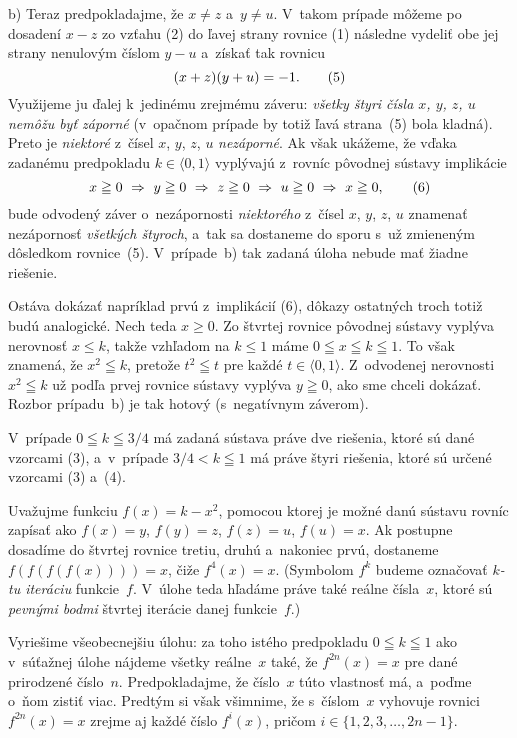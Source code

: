 {\smallskip
b) Teraz predpokladajme, že $x\ne z$ a~$ y \ne u$.
V~takom prípade môžeme po dosadení $x-z$ zo vzťahu (2)
do ľavej strany rovnice (1) následne vydeliť obe jej strany
nenulovým číslom $y-u$ a~získať tak rovnicu
$$
(x+z)(y+u) =-1.
\tag5
$$
Využijeme ju ďalej k~jedinému zrejmému záveru: {\sl všetky štyri
čísla $x$, $y$, $z$, $u$ nemôžu byť záporné} (v~opačnom prípade
by totiž ľavá strana~(5) bola kladná). Preto je {\it niektoré\/} z~čísel
$x$, $y$, $z$, $u$ {\it nezáporné}. Ak však ukážeme, že vďaka zadanému predpokladu
$k\in\langle0,1\rangle$ vyplývajú z~rovníc pôvodnej sústavy implikácie
$$
x\geqq0\ \Rightarrow\
y\geqq0\ \Rightarrow\
z\geqq0\ \Rightarrow\
u\geqq0\ \Rightarrow\
x\geqq0,
\tag6
$$
bude odvodený záver o~nezápornosti {\it niektorého\/} z~čísel $x$, $y$, $z$, $u$
znamenať nezápornosť {\it všetkých štyroch}, a~tak sa dostaneme do sporu s~už
zmieneným dôsledkom rovnice~(5). V~prípade~b) tak zadaná úloha
nebude mať žiadne riešenie.

Ostáva dokázať napríklad prvú z~implikácií (6),
dôkazy ostatných troch totiž budú analogické.
Nech teda $x\ge0$. Zo štvrtej rovnice
pôvodnej sústavy vyplýva nerovnosť $x \le k$, takže vzhľadom na
$k\le1$ máme $0\leqq x\leqq k\leqq1$. To však znamená, že
$x^2\leqq k$, pretože $t^2\leqq t$ pre každé
$t\in\langle0,1\rangle$. Z~odvodenej nerovnosti $x^2\leqq k$ už
podľa prvej rovnice sústavy vyplýva $y\geqq0$, ako sme chceli
dokázať. Rozbor prípadu~b) je tak hotový (s~negatívnym záverom).

\zaver
V~prípade $0\leqq k\leqq3/4$ má zadaná sústava práve dve riešenia,
ktoré sú dané vzorcami (3), a~v~prípade $3/4<k\leqq1$
má práve štyri riešenia, ktoré sú určené vzorcami (3) a~(4).

\ineriesenie
Uvažujme funkciu $f(x)=k-x^2$, pomocou ktorej je možné danú sústavu
rovníc zapísať ako $f(x)=y$, $f(y)=z$, $f(z)=u$, $f(u)=x$.
Ak postupne dosadíme do štvrtej rovnice tretiu, druhú a~nakoniec prvú,
dostaneme $f(f(f(f(x))))=x$, čiže $f^4 (x) = x$.
(Symbolom $f^k$ budeme označovať {\it $k$-tu iteráciu\/} funkcie~$f$.
V~úlohe teda hľadáme práve také reálne čísla~$x$,
ktoré sú {\it pevnými bodmi\/} štvrtej iterácie danej funkcie~$f$.)

Vyriešime všeobecnejšiu úlohu: za toho istého predpokladu $0\leqq k\leqq1$ ako
v~súťažnej úlohe nájdeme všetky reálne~$x$ také, že
$f^{2n}(x)=x$ pre dané prirodzené číslo~$n$. Predpokladajme, že
číslo~$x$ túto vlastnosť má, a~poďme o~ňom zistiť viac. Predtým
si však všimnime, že s~číslom~$x$ vyhovuje rovnici
$f^{2n}(x)=x$ zrejme aj každé číslo $f^i(x)$, pričom $i\in\{1,2,3,\dots,2n-1\}$.

}

